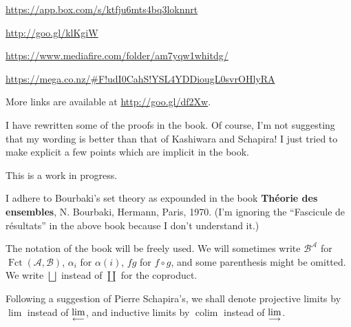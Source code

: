 \documentclass[12pt]{article}%
\theoremstyle{remark}
\newtheorem{rk}[thm]{Remark}
\theoremstyle{definition}
\newcommand{\nn}{\noindent}
\newcommand{\A}{\mathcal A}
\newcommand{\B}{\mathcal B}
\newcommand{\ilim}{\operatornamewithlimits{\underset{\longrightarrow}{lim}}}
\newcommand{\plim}{\operatornamewithlimits{\underset{\longleftarrow}{lim}}}
\DeclareMathOperator*{\colim}{colim}
\DeclareMathOperator{\Fct}{Fct}
\begin{document}
\noindent\href{https://app.box.com/s/ktfju6mts4bq3loknnrt}{https://app.box.com/s/ktfju6mts4bq3loknnrt}

\noindent\href{http://goo.gl/klKgiW}{http://goo.gl/klKgiW}

\nn\href{https://www.mediafire.com/folder/am7yqw1whitdg/}{https://www.mediafire.com/folder/am7yqw1whitdg/}

\nn\href{https://mega.co.nz/#F!udI0CahS!YSL4YDDiougL0svrOHlyRA}{https://mega.co.nz/\#F!udI0CahS!YSL4YDDiougL0svrOHlyRA}

More links are available at \href{http://goo.gl/df2Xw}{http://goo.gl/df2Xw}.

 

I have rewritten some of the proofs in the book. Of course, I'm not suggesting that my wording is better than that of Kashiwara and Schapira! I just tried to make explicit a few points which are implicit in the book. 

This is a work in progress. 


I adhere to Bourbaki's set theory as expounded in the book \textbf{Th\'eorie des ensembles}, N. Bourbaki, Hermann, Paris, 1970. (I'm ignoring the ``Fascicule de r\'esultats'' in the above book because I don't understand it.) 

The notation of the book will be freely used. We will sometimes write $\B^\A$ for $\Fct(\A,\B)$, $\alpha_i$ for $\alpha(i)$, $fg$ for $f\circ g$, and some parenthesis might be omitted. We write $\bigsqcup$\index{$\bigsqcup$} instead of $\coprod$\index{$\coprod$} for the coproduct. 

Following a suggestion of Pierre Schapira's, we shall denote projective limits by $\lim$\index{$\lim$} instead of $\plim$\index{$\plim$}, and inductive limits by $\colim$\index{$\colim$} instead of $\ilim$\index{$\ilim$}. 
\end{document}
